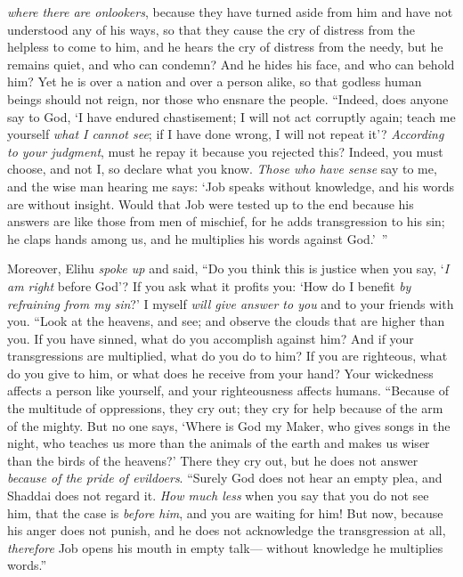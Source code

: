 \begin{biblechapter}
\textit{where there are onlookers},
\verse because they have turned aside from him 
and have not understood any of his ways,
\verse so that they cause the cry of distress from the helpless to come to him, 
and he hears the cry of distress from the needy,
\verse but he remains quiet, and who can condemn? 
And he hides his face, and who can behold him? 
Yet he is over a nation and over a person alike,
\verse so that godless human beings should not reign, 
nor those who ensnare the people.
\verse “Indeed, does anyone say to God, ‘I have endured chastisement; 
I will not act corruptly again;
\verse teach me yourself \textit{what I cannot see}; 
if I have done wrong, I will not repeat it’?
\verse \textit{According to your judgment}, must he repay it because you rejected this? 
Indeed, you must choose, and not I, so declare what you know.
\verse \textit{Those who have sense} say to me, 
and the wise man hearing me says:
\verse ‘Job speaks without knowledge, 
and his words are without insight.
\verse Would that Job were tested up to the end 
because his answers are like those from men of mischief,
\verse for he adds transgression to his sin; 
he claps hands among us, 
and he multiplies his words against God.’ ”
\end{biblechapter}

\begin{biblechapter} %
 Moreover, Elihu \textit{spoke up} and said,
\verse “Do you think this is justice when you say, 
‘\textit{I am right} before God’?
\verse If you ask what it profits you: 
‘How do I benefit \textit{by refraining from my sin}?’
\verse I myself \textit{will give answer to you} 
and to your friends with you.
\verse “Look at the heavens, and see; 
and observe the clouds that are higher than you.
\verse If you have sinned, what do you accomplish against him? 
And if your transgressions are multiplied, what do you do to him?
\verse If you are righteous, what do you give to him, 
or what does he receive from your hand?
\verse Your wickedness affects a person like yourself, 
and your righteousness affects humans.
\verse “Because of the multitude of oppressions, they cry out; 
they cry for help because of the arm of the mighty.
\verse But no one says, ‘Where is God my Maker, 
who gives songs in the night,
\verse who teaches us more than the animals of the earth 
and makes us wiser than the birds of the heavens?’
\verse There they cry out, but he does not answer 
\textit{because of the pride of evildoers}.
\verse “Surely God does not hear an empty plea, 
and Shaddai does not regard it.
\verse \textit{How much less} when you say that you do not see him, 
that the case is \textit{before him}, and you are waiting for him!
\verse But now, because his anger does not punish, 
and he does not acknowledge the transgression at all,
\verse \textit{therefore} Job opens his mouth in empty talk— 
without knowledge he multiplies words.”
\end{biblechapter}

